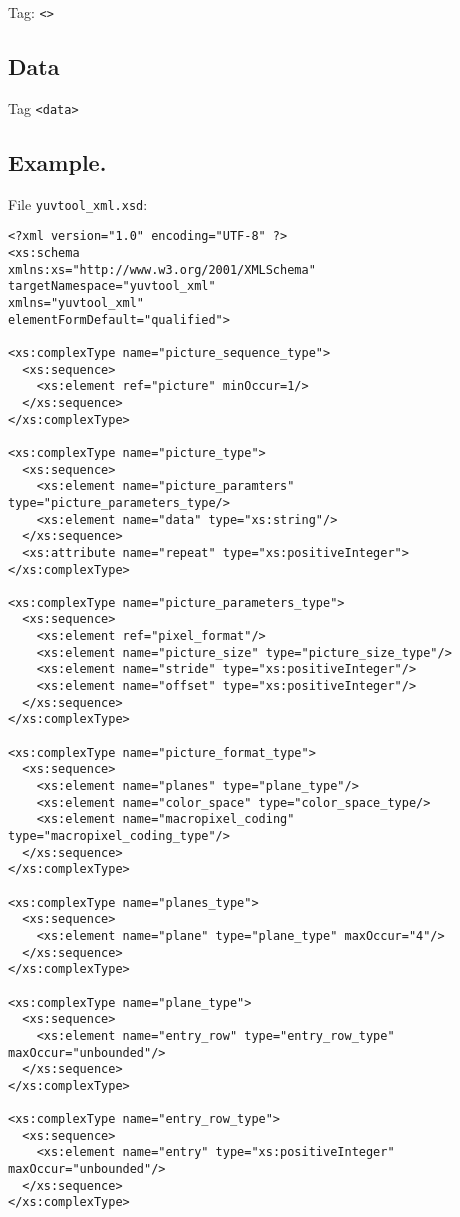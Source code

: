 Tag: \verb|<>|

\subsection{Data}

Tag \verb|<data>|

\subsection{Example.}

File \verb|yuvtool_xml.xsd|:
\begin{verbatim}
<?xml version="1.0" encoding="UTF-8" ?>
<xs:schema
xmlns:xs="http://www.w3.org/2001/XMLSchema"
targetNamespace="yuvtool_xml"
xmlns="yuvtool_xml"
elementFormDefault="qualified">

<xs:complexType name="picture_sequence_type">
  <xs:sequence>
    <xs:element ref="picture" minOccur=1/>
  </xs:sequence>
</xs:complexType>

<xs:complexType name="picture_type">
  <xs:sequence>
    <xs:element name="picture_paramters" type="picture_parameters_type/>
    <xs:element name="data" type="xs:string"/>
  </xs:sequence>
  <xs:attribute name="repeat" type="xs:positiveInteger">
</xs:complexType>

<xs:complexType name="picture_parameters_type">
  <xs:sequence>
    <xs:element ref="pixel_format"/>
    <xs:element name="picture_size" type="picture_size_type"/>
    <xs:element name="stride" type="xs:positiveInteger"/>
    <xs:element name="offset" type="xs:positiveInteger"/>
  </xs:sequence>
</xs:complexType>

<xs:complexType name="picture_format_type">
  <xs:sequence>
    <xs:element name="planes" type="plane_type"/>
    <xs:element name="color_space" type="color_space_type/>
    <xs:element name="macropixel_coding" type="macropixel_coding_type"/>
  </xs:sequence>
</xs:complexType>

<xs:complexType name="planes_type">
  <xs:sequence>
    <xs:element name="plane" type="plane_type" maxOccur="4"/>
  </xs:sequence>
</xs:complexType>

<xs:complexType name="plane_type">
  <xs:sequence>
    <xs:element name="entry_row" type="entry_row_type" maxOccur="unbounded"/>
  </xs:sequence>
</xs:complexType>

<xs:complexType name="entry_row_type">
  <xs:sequence>
    <xs:element name="entry" type="xs:positiveInteger" maxOccur="unbounded"/>
  </xs:sequence>
</xs:complexType>


\end{verbatim}

